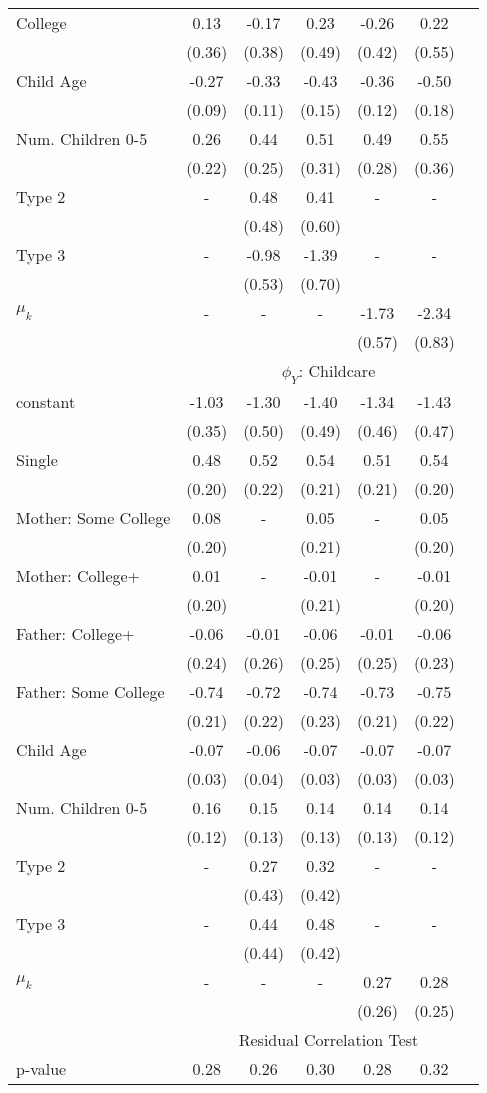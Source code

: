 \begin{tabular}{lcccccc}
College&0.13&-0.17&0.23&-0.26&0.22&\\&(0.36)&(0.38)&(0.49)&(0.42)&(0.55)&\\Child Age&-0.27&-0.33&-0.43&-0.36&-0.50&\\&(0.09)&(0.11)&(0.15)&(0.12)&(0.18)&\\Num. Children 0-5&0.26&0.44&0.51&0.49&0.55&\\&(0.22)&(0.25)&(0.31)&(0.28)&(0.36)&\\Type 2&-&0.48&0.41&-&-&\\&&(0.48)&(0.60)&&&\\Type 3&-&-0.98&-1.39&-&-&\\&&(0.53)&(0.70)&&&\\$\mu_{k}$&-&-&-&-1.73&-2.34&\\&&&&(0.57)&(0.83)&\\& \multicolumn{6}{c}{$\phi_{Y}$: Childcare}\\\cmidrule(r){2-7}constant&-1.03&-1.30&-1.40&-1.34&-1.43&\\&(0.35)&(0.50)&(0.49)&(0.46)&(0.47)&\\Single&0.48&0.52&0.54&0.51&0.54&\\&(0.20)&(0.22)&(0.21)&(0.21)&(0.20)&\\Mother: Some College&0.08&-&0.05&-&0.05&\\&(0.20)&&(0.21)&&(0.20)&\\Mother: College+&0.01&-&-0.01&-&-0.01&\\&(0.20)&&(0.21)&&(0.20)&\\Father: College+&-0.06&-0.01&-0.06&-0.01&-0.06&\\&(0.24)&(0.26)&(0.25)&(0.25)&(0.23)&\\Father: Some College&-0.74&-0.72&-0.74&-0.73&-0.75&\\&(0.21)&(0.22)&(0.23)&(0.21)&(0.22)&\\Child Age&-0.07&-0.06&-0.07&-0.07&-0.07&\\&(0.03)&(0.04)&(0.03)&(0.03)&(0.03)&\\Num. Children 0-5&0.16&0.15&0.14&0.14&0.14&\\&(0.12)&(0.13)&(0.13)&(0.13)&(0.12)&\\Type 2&-&0.27&0.32&-&-&\\&&(0.43)&(0.42)&&&\\Type 3&-&0.44&0.48&-&-&\\&&(0.44)&(0.42)&&&\\$\mu_{k}$&-&-&-&0.27&0.28&\\&&&&(0.26)&(0.25)&\\& \multicolumn{6}{c}{Residual Correlation Test}\\\cmidrule(r){2-7}p-value&0.28&0.26&0.30&0.28&0.32&\\
\bottomrule\end{tabular}
